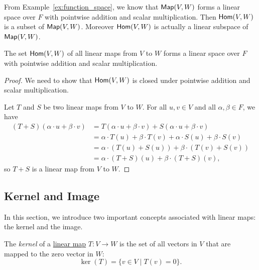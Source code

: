 From Example~\ref{ex:function_space}, we know that $\operatorname{\text{\normalfont\sffamily Map}}(V, W)$ forms a linear space over $F$ with pointwise addition and scalar multiplication. Then $\operatorname{\text{\normalfont\sffamily Hom}}(V, W)$ is a subset of $\operatorname{\text{\normalfont\sffamily Map}}(V, W)$. Moreover $\operatorname{\text{\normalfont\sffamily Hom}}(V, W)$ is actually a linear subspace of $\operatorname{\text{\normalfont\sffamily Map}}(V, W)$.
\begin{proposition}
  The set $\operatorname{\text{\normalfont\sffamily Hom}}(V, W)$ of all linear maps from $V$ to $W$ forms a linear space over $F$ with pointwise addition and scalar multiplication.
\end{proposition}
\begin{proof}
  We need to show that $\operatorname{\text{\normalfont\sffamily Hom}}(V, W)$ is closed under pointwise addition and scalar multiplication.

  Let $T$ and $S$ be two linear maps from $V$ to $W$. For all $u, v \in V$ and all $\alpha, \beta \in F$, we have
  \begin{align*}
    (T + S)(\alpha \cdot u + \beta \cdot v) & = T(\alpha \cdot u + \beta \cdot v) + S(\alpha \cdot u + \beta \cdot v)       \\
                                            & = \alpha \cdot T(u) + \beta \cdot T(v) + \alpha \cdot S(u) + \beta \cdot S(v) \\
                                            & = \alpha \cdot (T(u) + S(u)) + \beta \cdot (T(v) + S(v))                      \\
                                            & = \alpha \cdot (T + S)(u) + \beta \cdot (T + S)(v),
  \end{align*}
  so $T + S$ is a linear map from $V$ to $W$.
\end{proof}

\subsection{Kernel and Image}

In this section, we introduce two important concepts associated with linear maps: the kernel and the image.

\begin{definition}[Kernel]\label{def:kernel}
  The \emph{kernel} of a \hyperref[def:linear_map]{linear map} $T \colon V \to W$ is the set of all vectors in $V$ that are mapped to the zero vector in $W$:
  \[
    \ker(T) = \{ v \in V \mid T(v) = 0 \}.
  \]
\end{definition}

